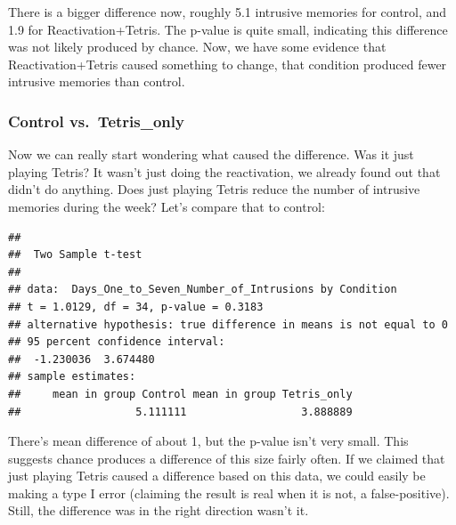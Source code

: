 \documentclass[]{book}
\newenvironment{Shaded}{\begin{snugshade}}{\end{snugshade}}
\newcommand{\KeywordTok}[1]{\textcolor[rgb]{0.13,0.29,0.53}{\textbf{#1}}}
\newcommand{\DataTypeTok}[1]{\textcolor[rgb]{0.13,0.29,0.53}{#1}}
\newcommand{\StringTok}[1]{\textcolor[rgb]{0.31,0.60,0.02}{#1}}
\newcommand{\OtherTok}[1]{\textcolor[rgb]{0.56,0.35,0.01}{#1}}
\newcommand{\OperatorTok}[1]{\textcolor[rgb]{0.81,0.36,0.00}{\textbf{#1}}}
\newcommand{\NormalTok}[1]{#1}
\begin{document}
There is a bigger difference now, roughly 5.1 intrusive memories for
control, and 1.9 for Reactivation+Tetris. The p-value is quite small,
indicating this difference was not likely produced by chance. Now, we
have some evidence that Reactivation+Tetris caused something to change,
that condition produced fewer intrusive memories than control.

\subsubsection{Control vs.~Tetris\_only}\label{control-vs.tetris_only}

Now we can really start wondering what caused the difference. Was it
just playing Tetris? It wasn't just doing the reactivation, we already
found out that didn't do anything. Does just playing Tetris reduce the
number of intrusive memories during the week? Let's compare that to
control:

\begin{Shaded}
\end{Shaded}

\begin{verbatim}
## 
##  Two Sample t-test
## 
## data:  Days_One_to_Seven_Number_of_Intrusions by Condition
## t = 1.0129, df = 34, p-value = 0.3183
## alternative hypothesis: true difference in means is not equal to 0
## 95 percent confidence interval:
##  -1.230036  3.674480
## sample estimates:
##     mean in group Control mean in group Tetris_only 
##                  5.111111                  3.888889
\end{verbatim}

There's mean difference of about 1, but the p-value isn't very small.
This suggests chance produces a difference of this size fairly often. If
we claimed that just playing Tetris caused a difference based on this
data, we could easily be making a type I error (claiming the result is
real when it is not, a false-positive). Still, the difference was in the
right direction wasn't it.
\end{document}
